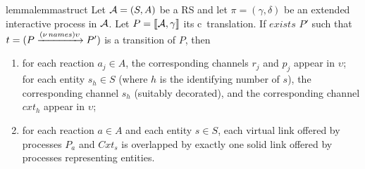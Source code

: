  \begin{restatable}[]{lemma}{lemmastruct}
 \label{lem:struct}
  Let ${\cal A} = (S, A)$ be a RS and let $\pi=(\gamma,\delta)$ be an extended  interactive process in ${\cal A}$. Let $P=\llbracket{\cal A},\gamma\rrbracket$ its c\CNA~translation. If $exists$ $P'$ such that $t= (P \xrightarrow{(\nu\, names)\upsilon} P')$ is a transition of $P$, then
  \begin{enumerate}
  \item for each reaction  $a_j \in A$, the corresponding channels $r_j$ and $p_j$ appear in  $\upsilon$; for each entity $s_h \in S$ (where $h$ is the identifying number of $s$), the corresponding channel $s_h$ (suitably decorated), and the corresponding channel $cxt_h$ appear in $\upsilon$; 
  \item for each reaction $a \in A$ and each entity $s \in S$, each virtual link offered by processes $P_a$ and $Cxt_s$ is  overlapped by exactly one solid link offered by  processes representing entities.
 
  \end{enumerate}
  \end{restatable}
 
